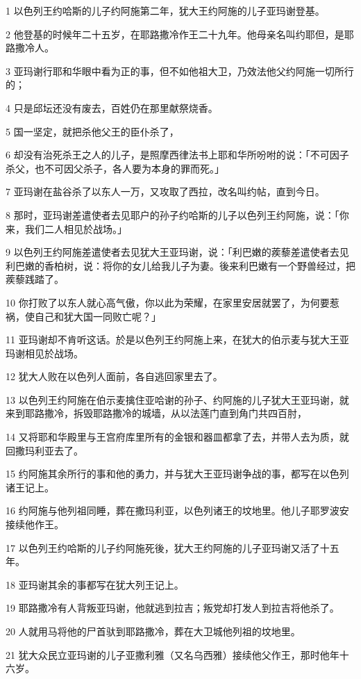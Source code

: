 \par 1 以色列王约哈斯的儿子约阿施第二年，犹大王约阿施的儿子亚玛谢登基。
\par 2 他登基的时候年二十五岁，在耶路撒冷作王二十九年。他母亲名叫约耶但，是耶路撒冷人。
\par 3 亚玛谢行耶和华眼中看为正的事，但不如他祖大卫，乃效法他父约阿施一切所行的；
\par 4 只是邱坛还没有废去，百姓仍在那里献祭烧香。
\par 5 国一坚定，就把杀他父王的臣仆杀了，
\par 6 却没有治死杀王之人的儿子，是照摩西律法书上耶和华所吩咐的说：「不可因子杀父，也不可因父杀子，各人要为本身的罪而死。」
\par 7 亚玛谢在盐谷杀了以东人一万，又攻取了西拉，改名叫约帖，直到今日。
\par 8 那时，亚玛谢差遣使者去见耶户的孙子约哈斯的儿子以色列王约阿施，说：「你来，我们二人相见於战场。」
\par 9 以色列王约阿施差遣使者去见犹大王亚玛谢，说：「利巴嫩的蒺藜差遣使者去见利巴嫩的香柏树，说：将你的女儿给我儿子为妻。後来利巴嫩有一个野兽经过，把蒺藜践踏了。
\par 10 你打败了以东人就心高气傲，你以此为荣耀，在家里安居就罢了，为何要惹祸，使自己和犹大国一同败亡呢？」
\par 11 亚玛谢却不肯听这话。於是以色列王约阿施上来，在犹大的伯示麦与犹大王亚玛谢相见於战场。
\par 12 犹大人败在以色列人面前，各自逃回家里去了。
\par 13 以色列王约阿施在伯示麦擒住亚哈谢的孙子、约阿施的儿子犹大王亚玛谢，就来到耶路撒冷，拆毁耶路撒冷的城墙，从以法莲门直到角门共四百肘，
\par 14 又将耶和华殿里与王宫府库里所有的金银和器皿都拿了去，并带人去为质，就回撒玛利亚去了。
\par 15 约阿施其余所行的事和他的勇力，并与犹大王亚玛谢争战的事，都写在以色列诸王记上。
\par 16 约阿施与他列祖同睡，葬在撒玛利亚，以色列诸王的坟地里。他儿子耶罗波安接续他作王。
\par 17 以色列王约哈斯的儿子约阿施死後，犹大王约阿施的儿子亚玛谢又活了十五年。
\par 18 亚玛谢其余的事都写在犹大列王记上。
\par 19 耶路撒冷有人背叛亚玛谢，他就逃到拉吉；叛党却打发人到拉吉将他杀了。
\par 20 人就用马将他的尸首驮到耶路撒冷，葬在大卫城他列祖的坟地里。
\par 21 犹大众民立亚玛谢的儿子亚撒利雅（又名乌西雅）接续他父作王，那时他年十六岁。
